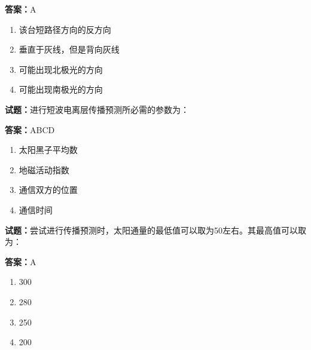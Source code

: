\documentclass{ctexbook}
\begin{document}
\textbf{答案：}A 

\begin{enumerate}[leftmargin=3em]
  \item 该台短路径方向的反方向 

  \item 垂直于灰线，但是背向灰线 


  \item 可能出现北极光的方向 

  \item 可能出现南极光的方向 

\end{enumerate}





\vspace{1em}

\textbf{试题：}进行短波电离层传播预测所必需的参数为： 

\textbf{答案：}ABCD 

\begin{enumerate}[leftmargin=3em]
  \item 太阳黑子平均数 

  \item 地磁活动指数 

  \item 通信双方的位置 

  \item 通信时间 

\end{enumerate}





\vspace{1em}

\textbf{试题：}尝试进行传播预测时，太阳通量的最低值可以取为50左右。其最高值可以取为： 

\textbf{答案：}A 

\begin{enumerate}[leftmargin=3em]
  \item 300 

  \item 280 

  \item 250 

  \item 200 

\end{enumerate}
\end{document}
